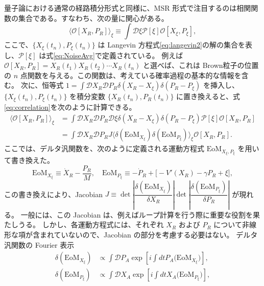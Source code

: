 量子論における通常の経路積分形式と同様に、MSR 形式で注目するのは相関関数の集合である。すなわち、次の量に関心がある。
\begin{equation}
 \langle \mathcal{O}[X_R,P_R] \rangle_\xi 
  \equiv \int \mathcal{D} \xi \mathcal P[\xi] \mathcal{O}[X_\xi,P_\xi], 
  \label{eq:correlation}
\end{equation}
ここで、$\{X_\xi(t_n), P_\xi(t_n)\}$ は Langevin 方程式\eqref{eq:langevin2}の解の集合を表し、$\mathcal P[\xi]$ は式\eqref{eq:NoiseAvg}で定義されている。
例えば $\mathcal{O}[X_R,P_R] = X_R(t_1) X_R(t_2) \cdots X_R(t_n)$ と選べば、これは Brown粒子の位置の $n$ 点関数を与える。この関数は、考えている確率過程の基本的な情報を含む。
次に、恒等式 $1 = \displaystyle{\int} \mathcal{D} X_R \mathcal{D} P_R \delta (X_R - X_\xi ) \delta (P_R - P_\xi )$ を挿入し、$\{X_\xi (t_n), P_\xi(t_n)\}$ を積分変数 $\{X_R(t_n), P_R(t_n)\}$ に置き換えると、式\eqref{eq:correlation}を次のように計算できる。
\begin{equation}
 \begin{split}
  \langle \mathcal{O}[X_R ,P_R] \rangle_\xi
  &= \int \mathcal{D} X_R  \mathcal{D} P_R \mathcal{D} \xi 
  \delta (X_R - X_\xi)  \delta (P_R - P_\xi) \mathcal P[\xi]
  \mathcal{O}[X_R,P_R] \\
  &= \int \mathcal{D} X_R \mathcal{D} P_R  J 
  \big\langle \delta (\mathrm{EoM}_{X_\xi}) \delta (\mathrm{EoM}_{P_\xi} )
  \big\rangle_\xi 
  \mathcal{O}[X_R,P_R] .
  \label{eq:2.9}
   \end{split}
\end{equation}
ここでは、デルタ汎関数を、次のように定義される運動方程式 $\mathrm{EoM}_{X_\xi, P_\xi}$ を用いて書き換えた。
\begin{equation}
 \mathrm{EoM}_{X_\xi}
 \equiv 
   \dot{X}_R - \frac{P_R}{M} , \quad
   \mathrm{EoM}_{P_\xi}
 \equiv 
  - \dot{P}_R + \big[ - V'(X_R) - \gamma P_R + \xi \big],
\end{equation}
この書き換えにより、Jacobian $J \equiv \det \left| \dfrac{\delta (\mathrm{EoM}_{X_\xi})}{\delta X_R} \right| \det \left| \dfrac{\delta (\mathrm{EoM}_{P_\xi})}{\delta P_R} \right|$ が現れる。
一般には、この Jacobian は、例えばループ計算を行う際に重要な役割を果たしうる。
しかし、各運動方程式には、それぞれ $X_R$ および $P_R$ について非線形な項が含まれていないので、Jacobian の部分を考慮する必要はない。
デルタ汎関数の Fourier 表示
\begin{align}
 \delta(\mathrm{EoM}_{X_\xi})
 &\propto
 \int \mathcal{D}P_A 
 \exp\left[ i\int dt P_A \big( \mathrm{EoM}_{X_\xi} \big) \right],\\
 \delta(\mathrm{EoM}_{P_\xi})
 &\propto \int \mathcal{D} X_A 
 \exp \left[ i\int dt X_A \big( \mathrm{EoM}_{P_\xi} \big) \right] ,
\end{align}
